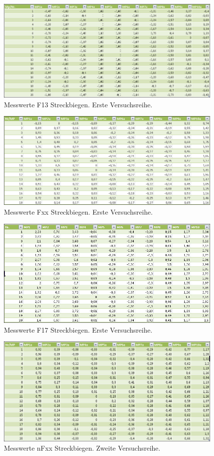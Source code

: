 \begin{figure}[H]
\centering
\includegraphics[width=.8\textwidth]{F13Bieg}
\caption{Messwerte F13 Streckbiegen. Erste Versuchsreihe.}
\label{F13Bieg}
\end{figure}
\begin{figure}[H]
\centering
\includegraphics[width=.8\textwidth]{FxxBieg}
\caption{Messwerte Fxx Streckbiegen. Erste Versuchsreihe.}
\label{FxxBieg}
\end{figure}
\begin{figure}[H]
\centering
\includegraphics[width=.8\textwidth]{F17Bieg}
\caption{Messwerte F17 Streckbiegen. Erste Versuchsreihe.}
\label{F17Bieg}
\end{figure}
\begin{figure}[H]
\centering
\includegraphics[width=.8\textwidth]{nFxxBieg}
\caption{Messwerte nFxx Streckbiegen. Zweite Versuchsreihe.}
\label{nFxxBieg}
\end{figure}
